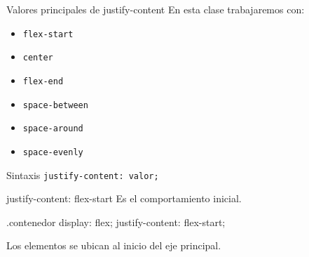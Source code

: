 \documentclass[aspectratio=169,11.5pt]{beamer}
\begin{document}
    \begin{frame}{Valores principales de justify-content}
        En esta clase trabajaremos con:

        \begin{itemize}
            \item \texttt{flex-start}
            \item \texttt{center}
            \item \texttt{flex-end}
            \item \texttt{space-between}
            \item \texttt{space-around}
            \item \texttt{space-evenly}
        \end{itemize}

        \begin{block}{Sintaxis}
            \texttt{justify-content: valor;}
        \end{block}
    \end{frame}

    \begin{frame}[fragile]{justify-content: flex-start}
        Es el comportamiento inicial.

        \begin{csscodedark}
            .contenedor {
                display: flex;
                justify-content: flex-start;
            }
        \end{csscodedark}

        \begin{center}
        \end{center}

        Los elementos se ubican al inicio del eje principal.
    \end{frame}
\end{document}
